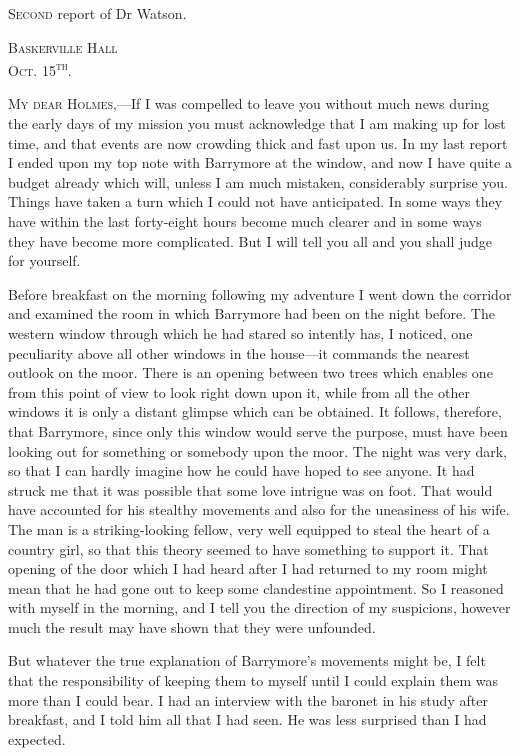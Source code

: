 \documentclass[paper=5.5in:8.5in,BCOR=7mm,twoside,DIV=calc,12pt,usegeometry,openany,chapterprefix,endperiod]{scrbook} %
\begin{document}
\lettrine[lines=1]{S}{econd} report of Dr Watson. \\

\hfill\begin{minipage}{0.5\linewidth}\textsc{Baskerville Hall\\Oct. 15\textsuperscript{th}.}\end{minipage}

\textsc{My dear Holmes},\nobreakdash---If I was compelled to leave you without much news during the early days of my mission you must acknowledge that I am making up for lost time, and that events are now crowding thick and fast upon us. In my last report I ended upon my top note with Barrymore at the window, and now I have quite a budget already which will, unless I am much mistaken, considerably surprise you. Things have taken a turn which I could not have anticipated. In some ways they have within the last forty-eight hours become much clearer and in some ways they have become more complicated. But I will tell you all and you shall judge for yourself.

Before breakfast on the morning following my adventure I went down the corridor and examined the room in which Barrymore had been on the night before. The western window through which he had stared so intently has, I noticed, one peculiarity above all other windows in the house\nobreakdash---it commands the nearest outlook on the moor. There is an opening between two trees which enables one from this point of view to look right down upon it, while from all the other windows it is only a distant glimpse which can be obtained. It follows, therefore, that Barrymore, since only this window would serve the purpose, must have been looking out for something or somebody upon the moor. The night was very dark, so that I can hardly imagine how he could have hoped to see anyone. It had struck me that it was possible that some love intrigue was on foot. That would have accounted for his stealthy movements and also for the uneasiness of his wife. The man is a striking-looking fellow, very well equipped to steal the heart of a country girl, so that this theory seemed to have something to support it. That opening of the door which I had heard after I had returned to my room might mean that he had gone out to keep some clandestine appointment. So I reasoned with myself in the morning, and I tell you the direction of my suspicions, however much the result may have shown that they were unfounded.

But whatever the true explanation of Barrymore's movements might be, I felt that the responsibility of keeping them to myself until I could explain them was more than I could bear. I had an interview with the baronet in his study after breakfast, and I told him all that I had seen. He was less surprised than I had expected.
\end{document}
